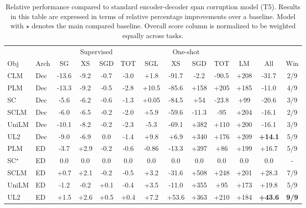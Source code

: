 \documentclass[10pt]{article}
\begin{document}
\begin{table*}[]
    \centering
\small
    \caption{Relative performance compared to standard encoder-decoder span corruption model (T5). Results in this table are expressed in terms of relative percentage improvements over a baseline. Model with $\star$ denotes the main compared baseline. Overall score column is normalized to be weighted equally across tasks.}
 \label{tab:relative_t5}
\begin{tabular}{llccccccccccc}
    \toprule
    & & \multicolumn{4}{c}{Supervised} & \multicolumn{4}{c}{One-shot}\\
        Obj &  Arch & SG & XS & SGD & TOT & SGL & XS & SGD & TOT   & LM & All & Win \\
        \midrule
  CLM       & Dec & -13.6 &	-9.2&	-0.7&	-3.0&	+1.8&	-91.7&	-2.2&	-90.5&	+208 & -31.7 & 2/9\\ 
PLM & Dec & -13.3	&  -9.2 & 	-0.5 & 	-2.8 & 	+10.5 & 	-85.6 & 	+158 & 	+205 & 	+185 &-11.0 & 4/9\\
SC & Dec & -5.6&	-6.2 &	-0.6&	-1.3&	+0.05&	-84.5&	+54&	-23.8&	+99 & -20.6 & 3/9\\
SCLM & Dec & -6.0	& -6.5 &	-0.2 &	-2.0  &	+5.9 &	-59.6	& -11.3 & 	-95 &	+204 & -16.1  & 2/9 \\
UniLM & Dec & -10.1 & 	-8.2 &	-0.2 &	-2.3 &	-5.3 &	-69.1 &	+382 &	+110 & 	+200 & -16.1 & 3/9\\
UL2 & Dec & -9.0 &	-6.9&	0.0&	-1.4&	+9.8&	+6.9&	+340&	+176	& +209 &  \textbf{+14.1} & 5/9 \\
  \midrule 
PLM & ED & -3.7& 	+2.9 &	-0.2&	-0.6	&-0.86&	-13.3&	+397	&+86&	+199 & +16.7 & 5/9 \\  
 SC$^\star$ & ED & 0.0	& 0.0	 & 0.0 &	0.0&	0.0 &	0.0 & 0.0 &	0.0 &	0.0 &	0.0 & - \\
 SCLM & ED & +0.7 &	+2.1	& -0.2 	& -0.5  &	+3.2 &	-31.6 &	+508 &	+248 &	+201 & +28.3 & 7/9 \\
 UniLM & ED &  -1.2 &	-0.2 &	+0.1 &	-0.4 &	+3.5 &	-11.0 &	+355 &	+95	 &+173 & +19.8 & 5/9\\
UL2 & ED & +1.5	& +2.6	&  +0.5 & 	+0.4 & 	+7.2& 	+53.6& 	+363& 	+210& 	+184 & \textbf{+43.6} & \textbf{9/9}\\
  \bottomrule 
    \end{tabular}
    
\end{table*}
\end{document}
